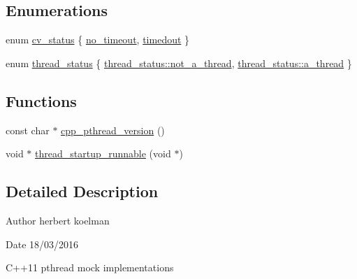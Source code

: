 \subsection*{Enumerations}
\begin{DoxyCompactItemize}
\item 
enum \hyperlink{namespacepthread_a823f88a2bf448bd5bd5273b826830bdd}{cv\+\_\+status} \{ \hyperlink{namespacepthread_a823f88a2bf448bd5bd5273b826830bdda633b1bc5140f77a22f2c26bea4fa3398}{no\+\_\+timeout}, 
\hyperlink{namespacepthread_a823f88a2bf448bd5bd5273b826830bdda1c2d3e88a4ad820053c817753867b31a}{timedout}
 \}
\item 
enum \hyperlink{namespacepthread_ac4b6e78f3d72c946ace7a92f3bec4101}{thread\+\_\+status} \{ \hyperlink{namespacepthread_ac4b6e78f3d72c946ace7a92f3bec4101a8414cd8c988083af4eabb1311df873cf}{thread\+\_\+status\+::not\+\_\+a\+\_\+thread}, 
\hyperlink{namespacepthread_ac4b6e78f3d72c946ace7a92f3bec4101a13b3689524b86ca2caaee82399099df1}{thread\+\_\+status\+::a\+\_\+thread}
 \}
\end{DoxyCompactItemize}
\subsection*{Functions}
\begin{DoxyCompactItemize}
\item 
const char $\ast$ \hyperlink{namespacepthread_ad04d8bbcf57d64ba29047b53432a9ceb}{cpp\+\_\+pthread\+\_\+version} ()
\item 
void $\ast$ \hyperlink{namespacepthread_a4ca2138b7b0d82d63a05c708edd45a6f}{thread\+\_\+startup\+\_\+runnable} (void $\ast$)
\end{DoxyCompactItemize}


\subsection{Detailed Description}
\begin{DoxyAuthor}{Author}
herbert koelman 
\end{DoxyAuthor}
\begin{DoxyDate}{Date}
18/03/2016
\end{DoxyDate}
C++11 pthread mock implementations 

